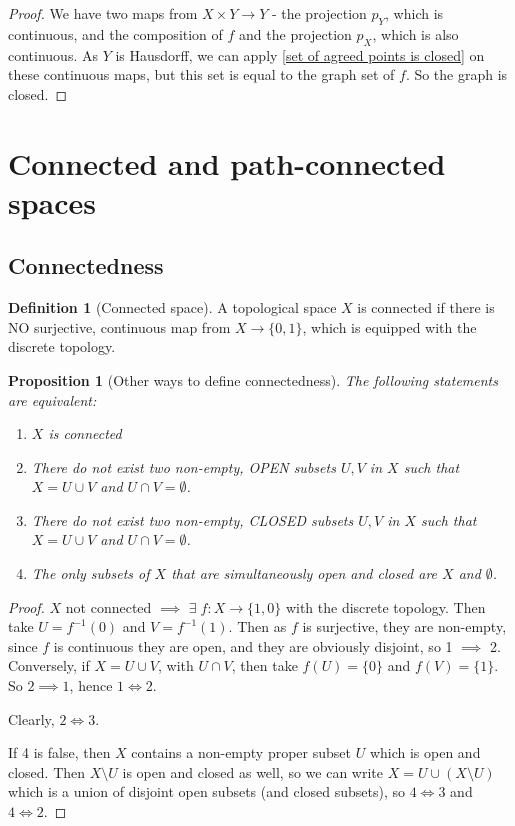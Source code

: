 \documentclass{article}
\theoremstyle{definition}
\newtheorem{defn}{Definition}[section]
\theoremstyle{plain}%
\newtheorem{prop}[thm]{Proposition}
\theoremstyle{remark}
\newcommand{\union}{\cup}
\newcommand{\intersection}{\cap}
\newcommand{\cross}{\times}
\begin{document}
\begin{proof}
    We have two maps from $X \cross Y \to Y$ - the projection $p_Y$, which is continuous, and the composition of $f$ and the projection $p_X$, which is also continuous. As $Y$ is Hausdorff, we can apply \ref{set of agreed points is closed} on these continuous maps, but this set is equal to the graph set of $f$. So the graph is closed.
\end{proof}

\section{Connected and path-connected spaces}

\subsection{Connectedness}

\begin{defn}[Connected space]
    A topological space $X$ is connected if there is NO surjective, continuous map from $X \to \{0,1\}$, which is equipped with the discrete topology.
\end{defn}

\begin{prop}[Other ways to define connectedness]
    The following statements are equivalent:
    \begin{enumerate}
        \item $X$ is connected
        \item There do not exist two non-empty, OPEN subsets $U, V$ in $X$ such that $X = U \union V$ and $U \intersection V = \emptyset$.
        \item There do not exist two non-empty, CLOSED subsets $U, V$ in $X$ such that $X = U \union V$ and $U \intersection V = \emptyset$.
        \item The only subsets of $X$ that are simultaneously open and closed are $X$ and $\emptyset$.
    \end{enumerate}
\end{prop}

\begin{proof}
    $X$ not connected $\implies$ $\exists \; f : X \to \{1,0\}$ with the discrete topology. Then take $U=f^{-1}(0)$ and $V = f^{-1}(1)$. Then as $f$ is surjective, they are non-empty, since $f$ is continuous they are open, and they are obviously disjoint, so 1 $\implies$ 2. Conversely, if $X=U\union V$, with $U \intersection V$, then take $f(U) = \{0\}$ and $f(V) = \{1\}$. So $2 \implies 1$, hence $1 \Leftrightarrow 2$.
    
    Clearly, $2 \Leftrightarrow 3$.
    
    If 4 is false, then $X$ contains a non-empty proper subset $U$ which is open and closed. Then $X \setminus U$ is open and closed as well, so we can write $X = U \union (X \setminus U)$ which is a union of disjoint open subsets (and closed subsets), so $4 \Leftrightarrow 3$ and $4 \Leftrightarrow 2$.
\end{proof}
\end{document}
